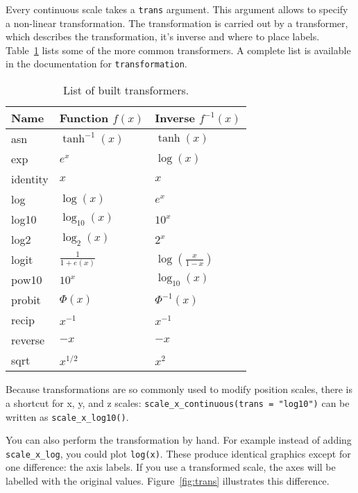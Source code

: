 Every continuous scale takes a {\tt trans} argument.  This argument allows to specify a non-linear transformation.  The transformation is carried out by a transformer, which describes the transformation, it's inverse and where to place labels. Table~\ref{tbl:common-trans} lists some of the more common transformers. A complete list is available in the documentation for {\tt transformation}.

\begin{table}
  \centering
  \begin{tabular}{lll}
    \toprule
    Name & Function $f(x)$ & Inverse $f^{-1}(x)$ \\
    \midrule
    asn       & $\tanh^{-1}(x)$ & $\tanh(x)$ \\
    exp       & $e ^ x$         & $\log(x)$  \\
    identity  & $x$             & $x$        \\
    log       & $\log(x)$       & $e ^ x$    \\
    log10     & $\log_{10}(x)$  & $10 ^ x$   \\
    log2      & $\log_2(x)$     & $2 ^ x$    \\
    logit     & $\frac{1}{1 + e(x)} $ & $\log(\frac{x}{1 - x})$ \\
    pow10     & $10^x$          & $\log_{10}(x) $ \\
    probit    & $\Phi(x)$       & $\Phi^{-1}(x)$ \\
    recip     & $x^{-1}$        & $x^{-1}$ \\
    reverse   & $-x$            & $-x$     \\
    sqrt      & $x^{1/2}$       & $x ^ 2$  \\
    \bottomrule
  \end{tabular}
  \caption{List of built transformers.}
  \label{tbl:common-trans}
\end{table}

Because transformations are so commonly used to modify position scales, there is a shortcut for x, y, and z scales: \verb|scale_x_continuous(trans = "log10")| can be written as \verb|scale_x_log10()|.

You can also perform the transformation by hand.  For example instead of adding {\tt scale\_x\_log}, you could plot {\tt log(x)}.  These produce identical graphics except for one difference: the axis labels.  If you use a transformed scale, the axes will be labelled with the original values.  Figure~\ref{fig:trans} illustrates this difference.

